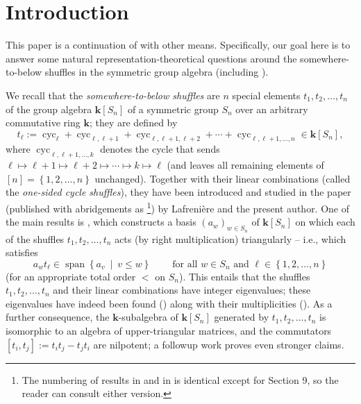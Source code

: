 \documentclass[numbers=enddot,12pt,final,onecolumn,notitlepage]{scrartcl}%
\theoremstyle{definition}
\begin{document}
\section{Introduction}

This paper is a continuation of \cite{s2b1} with other means. Specifically,
our goal here is to answer some natural representation-theoretical questions
around the somewhere-to-below shuffles in the symmetric group algebra
(including \cite[Question 16.12]{s2b1}).

We recall that the \emph{somewhere-to-below shuffles} are $n$ special elements
$t_{1},t_{2},\ldots,t_{n}$ of the group algebra $\mathbf{k}\left[
S_{n}\right]  $ of a symmetric group $S_{n}$ over an arbitrary commutative
ring $\mathbf{k}$; they are defined by
\[
t_{\ell}:=\operatorname*{cyc}\nolimits_{\ell}+\operatorname*{cyc}%
\nolimits_{\ell,\ell+1}+\operatorname*{cyc}\nolimits_{\ell,\ell+1,\ell
+2}+\cdots+\operatorname*{cyc}\nolimits_{\ell,\ell+1,\ldots,n}\in
\mathbf{k}\left[  S_{n}\right]  ,
\]
where $\operatorname*{cyc}\nolimits_{\ell,\ell+1,\ldots,k}$ denotes the cycle
that sends $\ell\mapsto\ell+1\mapsto\ell+2\mapsto\cdots\mapsto k\mapsto\ell$
(and leaves all remaining elements of $\left[  n\right]  =\left\{
1,2,\ldots,n\right\}  $ unchanged). Together with their linear combinations
(called the \emph{one-sided cycle shuffles}), they have been introduced and
studied in the paper \cite{s2b1} (published with abridgements as
\cite{s2b1-pub}\footnote{The numbering of results in \cite{s2b1} and in
\cite{s2b1-pub} is identical except for Section 9, so the reader can consult
either version.}) by Lafreni\`{e}re and the present author. One of the main
results is \cite[Theorem 11.1]{s2b1}, which constructs a basis $\left(
a_{w}\right)  _{w\in S_{n}}$ of $\mathbf{k}\left[  S_{n}\right]  $ on which
each of the shuffles $t_{1},t_{2},\ldots,t_{n}$ acts (by right multiplication)
triangularly -- i.e., which satisfies%
\[
a_{w}t_{\ell}\in\operatorname*{span}\left\{  a_{v}\ \mid\ v\leq w\right\}
\ \ \ \ \ \ \ \ \ \ \text{for all }w\in S_{n}\text{ and }\ell\in\left\{
1,2,\ldots,n\right\}
\]
(for an appropriate total order $<$ on $S_{n}$). This entails that the
shuffles $t_{1},t_{2},\ldots,t_{n}$ and their linear combinations have integer
eigenvalues; these eigenvalues have indeed been found (\cite[\S 12]{s2b1})
along with their multiplicities (\cite[\S 13]{s2b1}). As a further
consequence, the $\mathbf{k}$-subalgebra of $\mathbf{k}\left[  S_{n}\right]  $
generated by $t_{1},t_{2},\ldots,t_{n}$ is isomorphic to an algebra of
upper-triangular matrices, and the commutators $\left[  t_{i},t_{j}\right]
:=t_{i}t_{j}-t_{j}t_{i}$ are nilpotent; a followup work \cite{s2b2} proves
even stronger claims.
\end{document}
